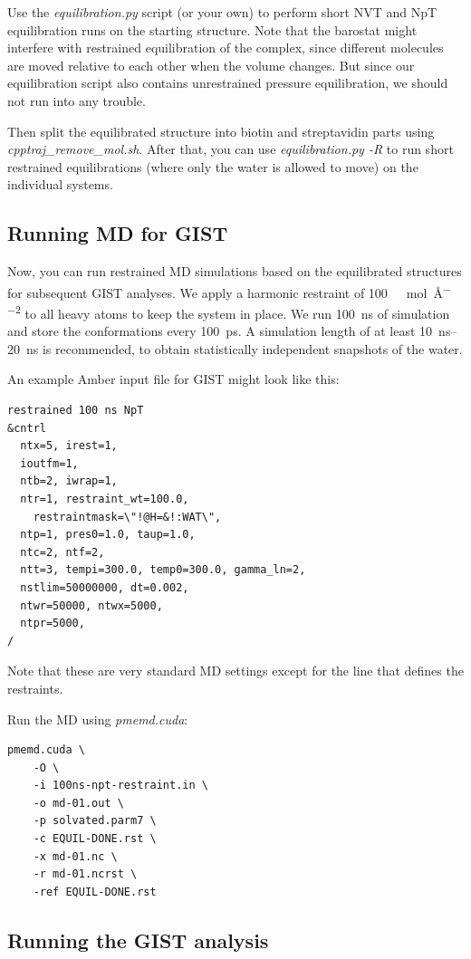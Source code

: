 \documentclass[9pt,tutorial]{livecoms}
\newcommand{\software}{\emph}
\begin{document}
Use the \software{equilibration.py} script (or your own) to perform short NVT and NpT equilibration runs on the starting structure.
Note that the barostat might interfere with restrained equilibration of the complex, since different molecules are moved relative to each other when the volume changes.
But since our equilibration script also contains unrestrained pressure equilibration, we should not run into any trouble.

Then split the equilibrated structure into biotin and streptavidin parts using \software{cpptraj\_remove\_mol.sh}.
After that, you can use \software{equilibration.py -R} to run short restrained equilibrations (where only the water is allowed to move) on the individual systems.

\subsection{Running MD for GIST}

Now, you can run restrained MD simulations based on the equilibrated structures for subsequent GIST analyses.
We apply a harmonic restraint of \SI{100}{\kilo\calorie\per\mole\per\angstrom\squared} to all heavy atoms to keep the system in place.
We run \SI{100}{\nano\second} of simulation and store the conformations every \SI{100}{\pico\second}.
A simulation length of at least \SIrange{10}{20}{\nano\second} is recommended, to obtain statistically independent snapshots of the water.

An example Amber input file for GIST might look like this:
\begin{lstlisting}
restrained 100 ns NpT
&cntrl
  ntx=5, irest=1,
  ioutfm=1,
  ntb=2, iwrap=1,
  ntr=1, restraint_wt=100.0,
    restraintmask=\"!@H=&!:WAT\",
  ntp=1, pres0=1.0, taup=1.0,
  ntc=2, ntf=2,
  ntt=3, tempi=300.0, temp0=300.0, gamma_ln=2,
  nstlim=50000000, dt=0.002,
  ntwr=50000, ntwx=5000,
  ntpr=5000,
/
\end{lstlisting}
Note that these are very standard MD settings except for the line that defines the restraints.

Run the MD using \software{pmemd.cuda}:
\begin{lstlisting}
pmemd.cuda \
	-O \
	-i 100ns-npt-restraint.in \
	-o md-01.out \
	-p solvated.parm7 \
	-c EQUIL-DONE.rst \
	-x md-01.nc \
	-r md-01.ncrst \
	-ref EQUIL-DONE.rst
\end{lstlisting}
\subsection{Running the GIST analysis}
\end{document}
